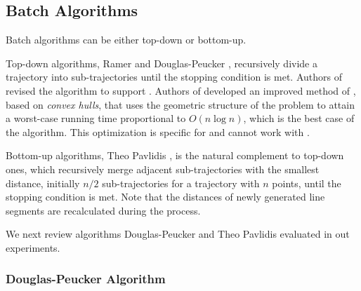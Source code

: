 \subsection{Batch Algorithms}
Batch algorithms can be either top-down or bottom-up.

Top-down algorithms, \eg Ramer \cite{Ramer:Split} and Douglas-Peucker \cite{Douglas:Peucker}, recursively divide a trajectory into sub-trajectories until the stopping condition is met.
Authors of \cite{Meratnia:Spatiotemporal} revised the \dpa algorithm to support \sed.
Authors of \cite{Hershberger:Speeding} developed an improved method of \dpa, based on \emph{convex hulls}, that uses the geometric structure of the problem to attain a worst-case running time proportional to $O(n\log n)$, which is the best case of the \dpa algorithm. {This optimization is specific for \ped and cannot work with \sed.}

Bottom-up algorithms, \eg Theo Pavlidis \cite{Pavlidis:Segment}, is the natural complement to top-down ones, which recursively merge adjacent sub-trajectories with the smallest distance, initially $n/2$  sub-trajectories for a trajectory with $n$ points, until the stopping condition is met. Note that the distances of newly generated line segments are recalculated during the process.

We next review algorithms Douglas-Peucker and Theo Pavlidis evaluated in out experiments.




\vspace{-1ex}
\subsubsection{Douglas-Peucker Algorithm}


